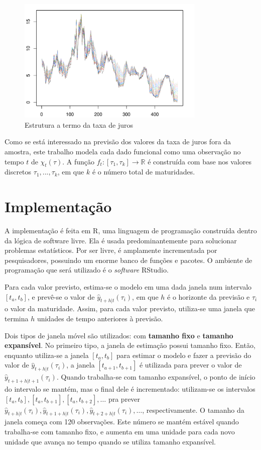 \documentclass[
	12pt,				%
	openright,			%
	oneside,			%
	a4paper,			%
	english,			%
	brazil				%
	]{dissertacao-ufrgs-abntex2}
\begin{document}
\begin{figure}[h!] 
  \centering
    \includegraphics[width=0.8\textwidth]{anexos/taxas_juro.pdf}
  \caption{Estrutura a termo da taxa de juros}
  \label{fig:est-termo}
\end{figure}

Como se está interessado na previsão dos valores da taxa de juros fora da amostra, este trabalho modela cada dado funcional como uma observação no tempo $t$ de $\chi_t(\tau)$. A função $f_t:[\tau_1,\tau_k] \rightarrow \mathbb{R}$ é construída com base nos valores discretos ${\tau_1, ..., \tau_k}$, em que $k$ é o número total de maturidades. 

\section{Implementação}

A implementação é feita em R, uma linguagem de programação construída dentro da lógica de software livre. Ela é usada predominantemente para solucionar problemas estatísticos. Por ser livre, é amplamente incrementada por pesquisadores, possuindo um enorme banco de funções e pacotes. O ambiente de programação que será utilizado é o \emph{software} RStudio.

Para cada valor previsto, estima-se o modelo em uma dada janela num intervalo $[t_a,t_b]$, e prevê-se o valor de  $\hat{y}_{t+h|t}(\tau_i)$, em que $h$ é o horizonte da previsão e $\tau_i$ o valor da maturidade. Assim, para cada valor previsto, utiliza-se uma janela que termina $h$ unidades de tempo anteriores à previsão.

Dois tipos de janela móvel são utilizados: com \textbf{tamanho fixo} e \textbf{tamanho expansível}. 
No primeiro tipo, a janela de estimação possui tamanho fixo. Então, enquanto utiliza-se a janela $[t_a,t_b]$ para estimar o modelo e fazer a previsão do valor de $\hat{y}_{t+h|t}(\tau_i)$, a janela $[t_{a+1},t_{b+1}]$ é utilizada para prever o valor de $\hat{y}_{t+1+h|t+1}(\tau_i)$. Quando trabalha-se com tamanho expansível, o ponto de início do intervalo se mantém, mas o final dele é incrementado: utilizam-se os intervalos $[t_{a},t_{b}] ,[t_{a},t_{b+1}],[t_{a},t_{b+2}],\dots$  pra prever $\hat{y}_{t+h|t}(\tau_i),\hat{y}_{t+1+h|t}(\tau_i),\hat{y}_{t+2+h|t}(\tau_i),\dots$, respectivamente. O tamanho da janela começa com 120 observações. Este número se mantém estável quando trabalha-se com tamanho fixo, e aumenta em uma unidade para cada novo unidade que avança no tempo quando se utiliza tamanho expansível.
\end{document}
